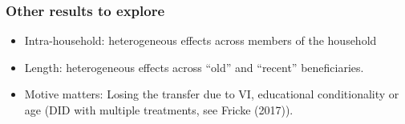 \documentclass{beamer}
\begin{document}
\begin{frame}
\frametitle{Other results to explore}
\begin{itemize}
	\item Intra-household: heterogeneous effects across members of the household 
	\item Length: heterogeneous effects across ``old'' and ``recent'' beneficiaries.
	\item Motive matters: Losing the transfer due to VI, educational conditionality or age (DID with multiple treatments, see Fricke (2017)).
\end{itemize}
\end{frame}
	
\end{document}

